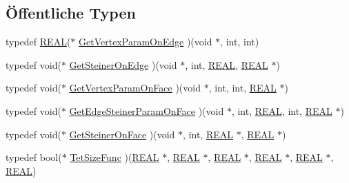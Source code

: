 \subsection*{Öffentliche Typen}
\begin{DoxyCompactItemize}
\item 
typedef \hyperlink{tetgen_8h_a4b654506f18b8bfd61ad2a29a7e38c25}{R\-E\-A\-L}($\ast$ \hyperlink{classtetgenio_a57d18c4c976af43f3e9743a11f78f1f7}{Get\-Vertex\-Param\-On\-Edge} )(void $\ast$, int, int)
\item 
typedef void($\ast$ \hyperlink{classtetgenio_ab5ba46cbbf0dd7ebc4875fa70b7f1c65}{Get\-Steiner\-On\-Edge} )(void $\ast$, int, \hyperlink{tetgen_8h_a4b654506f18b8bfd61ad2a29a7e38c25}{R\-E\-A\-L}, \hyperlink{tetgen_8h_a4b654506f18b8bfd61ad2a29a7e38c25}{R\-E\-A\-L} $\ast$)
\item 
typedef void($\ast$ \hyperlink{classtetgenio_a722d4a1ab76513e917be3466b85bb78f}{Get\-Vertex\-Param\-On\-Face} )(void $\ast$, int, int, \hyperlink{tetgen_8h_a4b654506f18b8bfd61ad2a29a7e38c25}{R\-E\-A\-L} $\ast$)
\item 
typedef void($\ast$ \hyperlink{classtetgenio_a351895a0365ff101d0400f18e1145e76}{Get\-Edge\-Steiner\-Param\-On\-Face} )(void $\ast$, int, \hyperlink{tetgen_8h_a4b654506f18b8bfd61ad2a29a7e38c25}{R\-E\-A\-L}, int, \hyperlink{tetgen_8h_a4b654506f18b8bfd61ad2a29a7e38c25}{R\-E\-A\-L} $\ast$)
\item 
typedef void($\ast$ \hyperlink{classtetgenio_a1f2d237a6b36007f8b3e3557cb9b5451}{Get\-Steiner\-On\-Face} )(void $\ast$, int, \hyperlink{tetgen_8h_a4b654506f18b8bfd61ad2a29a7e38c25}{R\-E\-A\-L} $\ast$, \hyperlink{tetgen_8h_a4b654506f18b8bfd61ad2a29a7e38c25}{R\-E\-A\-L} $\ast$)
\item 
typedef bool($\ast$ \hyperlink{classtetgenio_aa1b228427a0bdabc66cead91dd4497b8}{Tet\-Size\-Func} )(\hyperlink{tetgen_8h_a4b654506f18b8bfd61ad2a29a7e38c25}{R\-E\-A\-L} $\ast$, \hyperlink{tetgen_8h_a4b654506f18b8bfd61ad2a29a7e38c25}{R\-E\-A\-L} $\ast$, \hyperlink{tetgen_8h_a4b654506f18b8bfd61ad2a29a7e38c25}{R\-E\-A\-L} $\ast$, \hyperlink{tetgen_8h_a4b654506f18b8bfd61ad2a29a7e38c25}{R\-E\-A\-L} $\ast$, \hyperlink{tetgen_8h_a4b654506f18b8bfd61ad2a29a7e38c25}{R\-E\-A\-L} $\ast$, \hyperlink{tetgen_8h_a4b654506f18b8bfd61ad2a29a7e38c25}{R\-E\-A\-L})
\end{DoxyCompactItemize}
